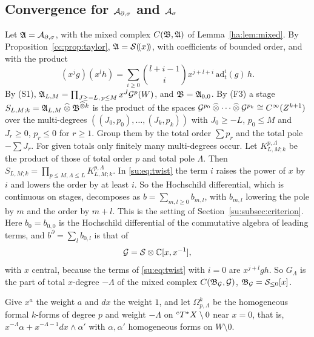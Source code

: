 \subsection{Convergence for \texorpdfstring{\(\mathcal A_{\partial,\sigma}\)}{Ads} and
\texorpdfstring{\(\mathcal A_\sigma\)}{As}}\label{su:subsec:B10}

Let \(\mathfrak A=\mathcal A_{\partial,\sigma}\), with the mixed complex \(C(\mathfrak B,\mathfrak A)\) of
Lemma~\ref{ha:lem:mixed}. By Proposition~\ref{cc:prop:taylor},
\(\mathfrak A=\mathcal S(\!(x)\!)\), with coefficients of bounded order, and with the
product
\begin{equation}\label{su:eq:twist}
 (x^jg)(x^lh)=\sum_{i\ge0}\binom{l+i-1}{i}x^{j+l+i}\,\mathrm{ad}_t^i(g)\,h .
\end{equation}
By (S1), \(\mathfrak A_{L,M}=\prod_{J\ge-L,\,p\le M}x^J\mathcal G^p(W)\), and
\(\mathfrak B=\mathfrak A_{0,0}\). By (F3) a stage \(S_{L,M;k}=\mathfrak A_{L,M}\mathbin{\widehat\otimes}
\mathfrak B^{\mathbin{\widehat\otimes} k}\) is the product of the spaces
\(\mathcal G^{p_0}\hot\dots\hot\mathcal G^{p_k}\cong\CI(Z^{k+1})\) over
the multi-degrees \(((J_0,p_0),\dots,(J_k,p_k))\) with \(J_0\ge-L\),
\(p_0\le M\) and \(J_r\ge0\), \(p_r\le0\) for \(r\ge1\). Group them by
the total order \(\sum p_r\) and the total pole \(-\sum J_r\). For given
totals only finitely many multi-degrees occur. Let
\(K^{p,\Lambda}_{L,M;k}\) be the product of those of total order \(p\) and
total pole \(\Lambda\). Then \(S_{L,M;k}=\prod_{p\le M,\Lambda\le L}
K^{p,\Lambda}_{L,M;k}\). In \eqref{su:eq:twist} the term \(i\) raises the
power of \(x\) by \(i\) and lowers the order by at least \(i\). So the
Hochschild differential, which is continuous on stages, decomposes as
\(b=\sum_{m,l\ge0}b_{m,l}\), with \(b_{m,l}\) lowering the pole by \(m\)
and the order by \(m+l\). This is the setting of
Section~\ref{su:subsec:criterion}. Here \(b_0=b_{0,0}\) is the Hochschild
differential of the commutative algebra of leading terms, and
\(b^\partial=\sum_lb_{0,l}\) is that of
\[
 \mathcal G=\mathcal S\otimes\mathbb C[x,x^{-1}],
\]
with \(x\) central, because the terms of \eqref{su:eq:twist} with \(i=0\)
are \(x^{j+l}gh\). So \(G_\Lambda\) is the part of total \(x\)-degree
\(-\Lambda\) of the mixed complex \(C(\mathfrak B_\mathcal G,\mathcal G)\),
\(\mathfrak B_\mathcal G=\mathcal S_{\le0}[x]\).

Give \(x^a\) the weight \(a\) and \(dx\) the weight \(1\), and let
\(\Omega^k_{p,\Lambda}\) be the homogeneous formal \(k\)-forms of degree
\(p\) and weight \(-\Lambda\) on \({}^cT^*X\setminus0\) near
\(x=0\), that is, \(x^{-\Lambda}\alpha+x^{-\Lambda-1}dx\wedge\alpha'\) with
\(\alpha,\alpha'\) homogeneous forms on \(W\setminus0\).

